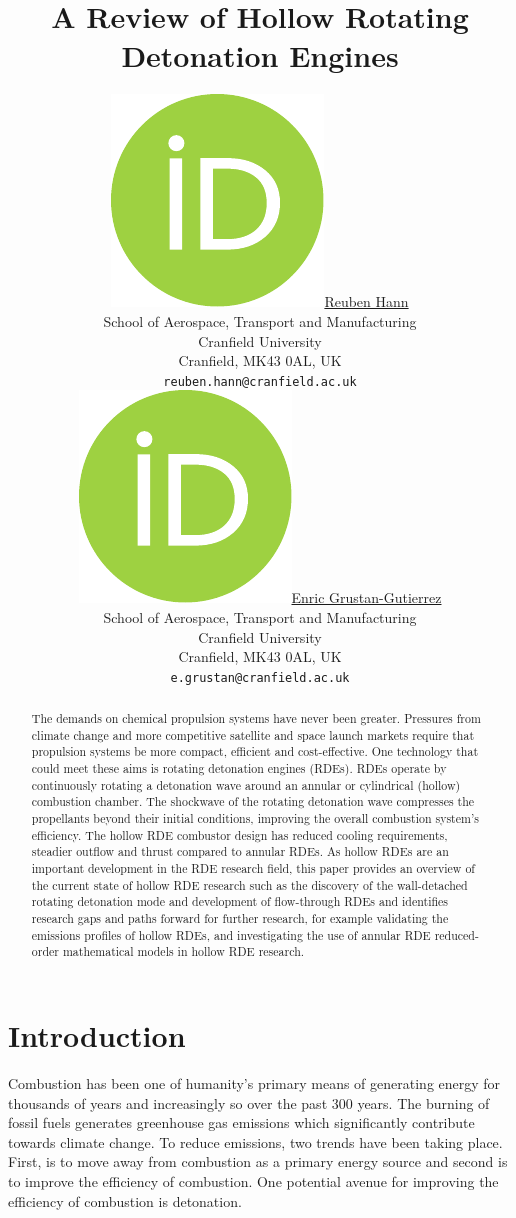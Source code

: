 \documentclass{article}
\title{A Review of Hollow Rotating Detonation Engines}
\author{ \href{https://orcid.org/0000-0002-0831-3736}{\includegraphics[scale=0.06]{orcid.pdf}\hspace{1mm}Reuben Hann}\\
	School of Aerospace, Transport and Manufacturing\\
	Cranfield University\\
	Cranfield, MK43 0AL, UK \\
	\texttt{reuben.hann@cranfield.ac.uk} \\
	\And
	\href{https://orcid.org/0000-0002-2898-2056}{\includegraphics[scale=0.06]{orcid.pdf}\hspace{1mm}Enric Grustan-Gutierrez} \\
	School of Aerospace, Transport and Manufacturing\\
	Cranfield University\\
	Cranfield, MK43 0AL, UK \\
	\texttt{e.grustan@cranfield.ac.uk} \\
}
\begin{document}
\maketitle

\begin{abstract}
The demands on chemical propulsion systems have never been greater. Pressures from climate change and more competitive satellite and space launch markets require that propulsion systems be more compact, efficient and cost-effective. One technology that could meet these aims is rotating detonation engines (RDEs). RDEs operate by continuously rotating a detonation wave around an annular or cylindrical (hollow) combustion chamber. The shockwave of the rotating detonation wave compresses the propellants beyond their initial conditions, improving the overall combustion system’s efficiency. The hollow RDE combustor design has reduced cooling requirements, steadier outflow and thrust compared to annular RDEs. As hollow RDEs are an important development in the RDE research field, this paper provides an overview of the current state of hollow RDE research such as the discovery of the wall-detached rotating detonation mode and development of flow-through RDEs and identifies research gaps and paths forward for further research, for example validating the emissions profiles of hollow RDEs, and investigating the use of annular RDE reduced-order mathematical models in hollow RDE research.
\end{abstract}




\section{Introduction}

Combustion has been one of humanity’s primary means of generating energy for thousands of years and increasingly so over the past 300 years. The burning of fossil fuels generates greenhouse gas emissions which significantly contribute towards climate change. To reduce emissions, two trends have been taking place. First, is to move away from combustion as a primary energy source and second is to improve the efficiency of combustion. One potential avenue for improving the efficiency of combustion is detonation.
\par
\end{document}
